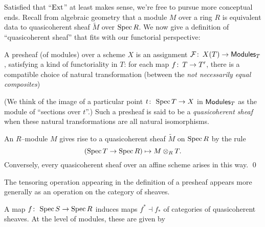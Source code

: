 Satisfied that ``$\operatorname{Ext}$'' at least makes sense, we're free to pursue more conceptual ends.  Recall from algebraic geometry that a module $M$ over a ring $R$ is equivalent data to quasicoherent sheaf $\widetilde{M}$ over $\operatorname{Spec} R$.  We now give a definition of ``quasicoherent sheaf'' that fits with our functorial perspective:
\begin{definition}\label{DefnQCohSheaves}
A presheaf (of modules) over a scheme $X$ is an assignment $\mathcal{F}\colon\thinspace X(T) \to \mathsf{Modules}_T$, satisfying a kind of functoriality in $T$: for each map $f\colon\thinspace T \to T'$, there is a compatible choice of natural transformation (between the \emph{not necessarily equal composites})
\begin{center}
\end{center}
(We think of the image of a particular point $t\colon\thinspace \operatorname{Spec} T \to X$ in $\mathsf{Modules}_T$ as the module of ``sections over $t$''.)  Such a presheaf is said to be a \textit{quasicoherent sheaf} when these natural transformations are all natural isomorphisms.
\end{definition}

\begin{lemma}\label{CorrespondenceQCohAndModules}
An $R$--module $M$ gives rise to a quasicoherent sheaf $\widetilde M$ on $\operatorname{Spec} R$ by the rule \[(\operatorname{Spec} T \to \operatorname{Spec} R) \mapsto M \otimes_R T.\]  Conversely, every quasicoherent sheaf over an affine scheme arises in this way.  \qed
\end{lemma}

The tensoring operation appearing in the definition of a presheaf appears more generally as an operation on the category of sheaves.

\begin{definition}\label{PushAndPullForQCohOnAffines}
A map $f\colon\thinspace \operatorname{Spec} S \to \operatorname{Spec} R$ induces maps $f^* \dashv f_*$ of categories of quasicoherent sheaves.  At the level of modules, these are given by
\begin{center}
\end{center}
\end{definition}

